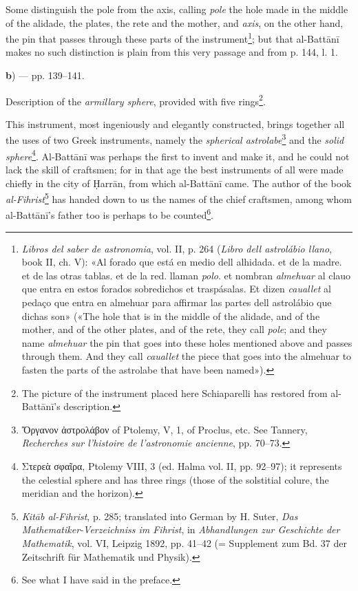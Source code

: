 \documentclass[11pt]{article}
\newcommand{\Pg}[1]{\marginpar{\footnotesize\color{gray}#1}}
\begin{document}
\par Some distinguish the pole from the axis, calling \emph{pole} the hole made in the middle of the alidade, the plates, the rete and the mother, and \emph{axis}, on the other hand, the pin that passes through these parts of the instrument\footnote{\emph{Libros del saber de astronomia}, vol. II, p. 264 (\emph{Libro dell astrolábio llano}, book II, ch. V): «Al forado que está en medio dell alhidada. et de la madre. et de las otras tablas. et de la red. llaman \emph{polo}. et nombran \emph{almehuar} al clauo que entra en estos forados sobredichos et traspásalas. Et dizen \emph{cauallet} al pedaço que entra en almehuar para affirmar las partes dell astrolábio que dichas son» («The hole that is in the middle of the alidade, and of the mother, and of the other plates, and of the rete, they call \emph{pole}; and they name \emph{almehuar} the pin that goes into these holes mentioned above and passes through them. And they call \emph{cauallet} the piece that goes into the almehuar to fasten the parts of the astrolabe that have been named»).}; but that al-Battānī makes no such distinction is plain from this very passage and from p. 144, l. 1.\par
\par\begin{center}\textbf{b}) — pp. 139–141.\end{center}
\par Description of the \emph{armillary sphere}, provided with five rings\footnote{The picture of the instrument placed here Schiaparelli has restored from al-Battānī's description.}.\par
\par \Pg{I 320}This instrument, most ingeniously and elegantly constructed, brings together all the uses of two Greek instruments, namely the \emph{spherical astrolabe}\footnote{{\greekfont Ὄργανον ἀστρολάβον} of Ptolemy, V, 1, of Proclus, etc. See Tannery, \emph{Recherches sur l'histoire de l'astronomie ancienne}, pp. 70–73.} and the \emph{solid sphere}\footnote{{\greekfont Στερεὰ σφαῖρα}, Ptolemy VIII, 3 (ed. Halma vol. II, pp. 92–97); it represents the celestial sphere and has three rings (those of the solstitial colure, the meridian and the horizon).}. Al-Battānī was perhaps the first to invent and make it, and he could not lack the skill of craftsmen; for in that age the best instruments of all were made chiefly in the city of Ḥarrān, from which al-Battānī came. The author of the book \emph{al-Fihrist}\footnote{\emph{Kitāb al-Fihrist}, p. 285; translated into German by H. Suter, \emph{Das Mathematiker-Verzeichniss im Fihrist}, in \emph{Abhandlungen zur Geschichte der Mathematik}, vol. VI, Leipzig 1892, pp. 41–42 (= Supplement zum Bd. 37 der Zeitschrift für Mathematik und Physik).} has handed down to us the names of the chief craftsmen, among whom al-Battānī's father too is perhaps to be counted\footnote{See what I have said in the preface.}.\par
\end{document}

